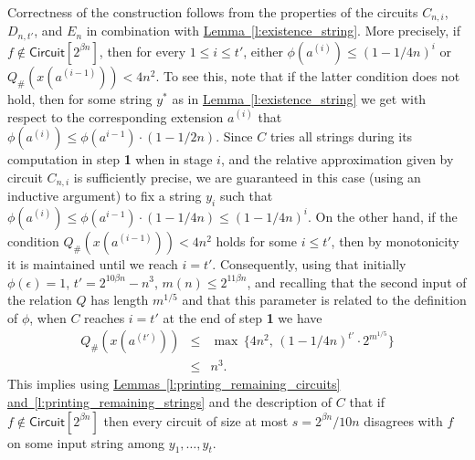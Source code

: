 \documentclass[11pt]{article}
\numberwithin{equation}{section}
\theoremstyle{definition}
\theoremstyle{plain}
\newcommand{\expref}[2]{\hyperref[#2]{#1~\ref{#2}}}
\begin{document}
Correctness of the construction follows from the properties of the circuits $C_{n,i}$, $D_{n,t'}$, and $E_n$ in combination with \expref{Lemma}{l:existence_string}. More precisely, if $f \notin \mathsf{Circuit}[2^{\beta n}]$, then for every $1 \leq i \leq t'$, either $\phi(a^{(i)}) \leq (1 - 1/4n)^i$ or $Q_{\#}(x(a^{(i-1)})) < 4n^2$. To see this, note that if the latter condition does not hold, then for some string $y^*$ as in \expref{Lemma}{l:existence_string} we get with respect to the corresponding extension $a^{(i)}$ that $\phi(a^{(i)}) \leq \phi(a^{i-1}) \cdot (1 - 1/2n)$. Since $C$ tries all strings during its computation in step \textbf{1} when in stage $i$, and the relative approximation given by circuit $C_{n,i}$ is sufficiently precise, we are guaranteed in this case (using an inductive argument) to fix a string $y_i$ such that $\phi(a^{(i)}) \leq \phi(a^{i-1}) \cdot (1 - 1/4n) \leq (1 - 1/4n)^i$. On the other hand, if the condition $Q_{\#}(x(a^{(i-1)})) < 4n^2$ holds for some $i \leq t'$, then by monotonicity it is maintained until we reach $i = t'$. Consequently, using that initially $\phi(\epsilon) = 1$, $t' = 2^{10 \beta n} - n^3$, $m(n) \leq 2^{11 \beta n}$, and recalling that the second input of the relation $Q$ has length $m^{1/5}$ and that this parameter is related to the definition of $\phi$, when $C$ reaches $i = t'$ at the end of step \textbf{1} we have
\begin{eqnarray}
Q_{\#}(x(a^{(t')})) & \leq & \max \,\{4n^2, \,(1 - 1/4n)^{t'} \cdot 2^{m^{1/5}}\} \nonumber \\
& \leq & n^3. \nonumber 
\end{eqnarray}
This implies using \expref{Lemmas}{l:printing_remaining_circuits} \expref{and}{l:printing_remaining_strings} and the description of $C$ that if $f \notin \mathsf{Circuit}[2^{\beta n}]$ then every circuit of size at most $s = 2^{\beta n}/10n$ disagrees with $f$ on some input string among $y_1, \ldots, y_t$.
\end{document}
